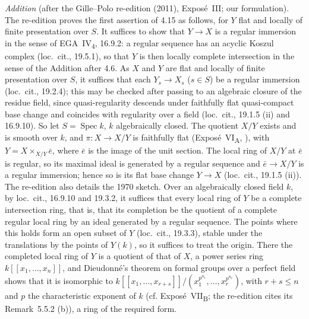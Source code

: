 \emph{Addition} (after the Gille--Polo re-edition (2011), Exposé~III; our
formulation). The re-edition proves the first assertion of 4.15 as follows,
for \(Y\) flat and locally of finite presentation over \(S\). It suffices to
show that \(Y\to X\) is a regular immersion in the sense of
EGA~IV\textsubscript{4}, 16.9.2: a regular sequence has an acyclic Koszul
complex (loc.\ cit., 19.5.1), so that \(Y\) is then locally complete
intersection in the sense of the Addition after 4.6. As \(X\) and \(Y\) are
flat and locally of finite presentation over \(S\), it suffices that each
\(Y_s\to X_s\) (\(s\in S\)) be a regular immersion (loc.\ cit., 19.2.4); this
may be checked after passing to an algebraic closure of the residue field,
since quasi-regularity descends under faithfully flat quasi-compact base
change and coincides with regularity over a field (loc.\ cit., 19.1.5 (ii)
and 16.9.10). So let \(S=\operatorname{Spec}k\), \(k\) algebraically closed.
The quotient \(X/Y\) exists and is smooth over \(k\), and
\(\pi\colon X\to X/Y\) is faithfully flat (Exposé~VI\textsubscript{A},
), with \(Y=X\times_{X/Y}\bar e\), where \(\bar e\) is the image of the unit
section. The local ring of \(X/Y\) at \(\bar e\) is regular, so its maximal
ideal is generated by a regular sequence and \(\bar e\to X/Y\) is a regular
immersion; hence so is its flat base change \(Y\to X\) (loc.\ cit., 19.1.5
(ii)). The re-edition also details the 1970 sketch. Over an algebraically
closed field \(k\), by loc.\ cit., 16.9.10 and 19.3.2, it suffices that every
local ring of \(Y\) be a complete intersection ring, that is, that its
completion be the quotient of a complete regular local ring by an ideal
generated by a regular sequence. The points where this holds form an open
subset of \(Y\) (loc.\ cit., 19.3.3), stable under the translations by the
points of \(Y(k)\), so it suffices to treat the origin. There the completed
local ring of \(Y\) is a quotient of that of \(X\), a power series ring
\(k[[x_1,\ldots,x_n]]\), and Dieudonné's theorem on formal groups over a
perfect field shows that it is isomorphic to
\(k[[x_1,\ldots,x_{r+s}]]/(x_1^{p^{n_1}},\ldots,x_r^{p^{n_r}})\), with
\(r+s\leq n\) and \(p\) the characteristic exponent of \(k\) (cf.
Exposé~VII\textsubscript{B}; the re-edition cites its Remark~5.5.2 (b)), a
ring of the required form.

